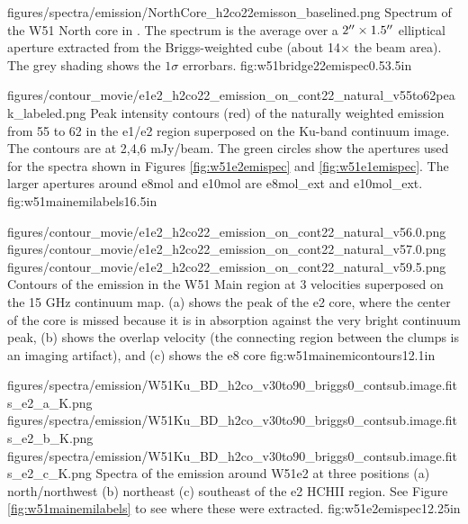 
\Figure
{{figures/spectra/emission/NorthCore_h2co22emisson_baselined}.png}
{Spectrum of the W51 North core in \ortho \twotwo.  The spectrum
is the average over a $2\mbox{$^{\prime\prime}$}\times1.5\mbox{$^{\prime\prime}$}$ elliptical aperture extracted
from the Briggs-weighted cube (about 14$\times$ the beam area).  The grey
shading shows the $1\sigma$
errorbars.
}
{fig:w51bridge22emispec}{0.5}{3.5in}

\Figure
{figures/contour_movie/e1e2_h2co22_emission_on_cont22_natural_v55to62peak_labeled.png}
{ Peak intensity contours (red) of the naturally weighted \formaldehyde \twotwo
emission from 55 to 62 \kms in the e1/e2 region superposed on the Ku-band
continuum image.  The contours are at 2,4,6 mJy/beam.  The green circles show
the apertures used for the spectra shown in Figures
\ref{fig:w51e2emispec} and
\ref{fig:w51e1emispec}.  The larger apertures around e8mol and e10mol are
e8mol\_ext and e10mol\_ext.
}{fig:w51mainemilabels}{1}{6.5in}

\FigureThreeAA
{figures/contour_movie/e1e2_h2co22_emission_on_cont22_natural_v56.0.png}
{figures/contour_movie/e1e2_h2co22_emission_on_cont22_natural_v57.0.png}
{figures/contour_movie/e1e2_h2co22_emission_on_cont22_natural_v59.5.png}
{Contours of the \formaldehyde \twotwo emission in the W51 Main region at 3
velocities superposed on the 15 GHz continuum map.  (a) shows the peak of the e2
core, where the center of the core is missed because it is in absorption
against the very bright continuum peak, (b) shows the overlap velocity (the
connecting region between the clumps is an imaging artifact),
and (c) shows the e8 core}
{fig:w51mainemicontours}{1}{2.1in}

\FigureThreeAA
{figures/spectra/emission/W51Ku_BD_h2co_v30to90_briggs0_contsub.image.fits_e2_a_K.png}
{figures/spectra/emission/W51Ku_BD_h2co_v30to90_briggs0_contsub.image.fits_e2_b_K.png}
{figures/spectra/emission/W51Ku_BD_h2co_v30to90_briggs0_contsub.image.fits_e2_c_K.png}
{Spectra of the \twotwo emission around W51e2 at three positions (a)
north/northwest (b) northeast (c) southeast of the e2 HCHII region.  See Figure
\ref{fig:w51mainemilabels} to see where these were extracted.}
{fig:w51e2emispec}{1}{2.25in}

